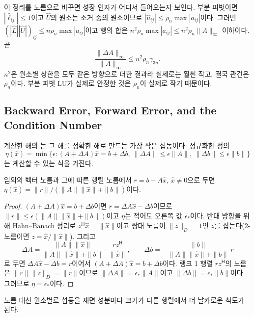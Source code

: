 이 정리를 노름으로 바꾸면 성장 인자가 어디서 들어오는지 보인다. 부분 피벗이면 $|\hat\ell_{ij}|\le1$이고 $\hat U$의 원소는 소거 중의 원소이므로 $|\hat u_{ij}|\le\rho_n\max|a_{ij}|$이다. 그러면 $(|\hat L||\hat U|)_{ij}\le n\rho_n\max|a_{ij}|$이고 행의 합은 $n^2\rho_n\max|a_{ij}|\le n^2\rho_n\|A\|_\infty$ 이하이다. 곧
\begin{equation}
\label{eq:lu-normwise}
\frac{\|\Delta A\|_\infty}{\|A\|_\infty}\le n^2\rho_n\gamma_{3n}.
\end{equation}
$n^2$은 원소별 상한을 모두 같은 방향으로 더한 결과라 실제로는 훨씬 작고, 결국 관건은 $\rho_n$이다. 부분 피벗 LU가 실제로 안정한 것은 $\rho_n$이 실제로 작기 때문이다.

\subsection{Backward Error, Forward Error, and the Condition Number}

계산한 해의 는 그 해를 정확한 해로 만드는 가장 작은 섭동이다. 정규화한 정의
\[
\eta(\hat x)=\min\{\epsilon:(A+\Delta A)\hat x=b+\Delta b,\ \|\Delta A\|\le\epsilon\|A\|,\ \|\Delta b\|\le\epsilon\|b\|\}
\]
는 계산할 수 있는 식을 가진다.

\begin{theorem}
\label{thm:lu-rigal-gaches}
임의의 벡터 노름과 그에 따른 행렬 노름에서 $r=b-A\hat x$, $\hat x\ne0$으로 두면 $\eta(\hat x)=\|r\|/(\|A\|\|\hat x\|+\|b\|)$이다.
\end{theorem}

\begin{proof}
$(A+\Delta A)\hat x=b+\Delta b$이면 $r=\Delta A\hat x-\Delta b$이므로 $\|r\|\le\epsilon(\|A\|\|\hat x\|+\|b\|)$이고 $\eta$는 적어도 오른쪽 값 $\epsilon_\ast$이다. 반대 방향을 위해 Hahn--Banach 정리로 $z^{\mathsf H}\hat x=\|\hat x\|$이고 쌍대 노름이 $\|z\|_D=1$인 $z$를 잡는다(2-노름이면 $z=\hat x/\|\hat x\|$). 그리고
\[
\Delta A=\frac{\|A\|\|\hat x\|}{\|A\|\|\hat x\|+\|b\|}\cdot\frac{rz^{\mathsf H}}{\|\hat x\|},\qquad
\Delta b=-\frac{\|b\|}{\|A\|\|\hat x\|+\|b\|}\,r
\]
로 두면 $\Delta A\hat x-\Delta b=r$이어서 $(A+\Delta A)\hat x=b+\Delta b$이다. 랭크 1 행렬 $rz^{\mathsf H}$의 노름은 $\|r\|\|z\|_D=\|r\|$이므로 $\|\Delta A\|=\epsilon_\ast\|A\|$이고 $\|\Delta b\|=\epsilon_\ast\|b\|$이다. 그러므로 $\eta=\epsilon_\ast$이다.
\end{proof}

노름 대신 원소별로 섭동을 재면 성분마다 크기가 다른 행렬에서 더 날카로운 척도가 된다.

